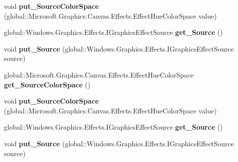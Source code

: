 \begin{DoxyCompactItemize}
void {\bfseries put\+\_\+\+Source\+Color\+Space} (global\+::\+Microsoft.\+Graphics.\+Canvas.\+Effects.\+Effect\+Hue\+Color\+Space value)
\item 
\mbox{\label{interface_microsoft_1_1_graphics_1_1_canvas_1_1_effects_1_1_i_hue_to_rgb_effect_a0d8641879596727e5f250feac4374dd2}} 
global\+::\+Windows.\+Graphics.\+Effects.\+I\+Graphics\+Effect\+Source {\bfseries get\+\_\+\+Source} ()
\item 
\mbox{\label{interface_microsoft_1_1_graphics_1_1_canvas_1_1_effects_1_1_i_hue_to_rgb_effect_a10be0ca9703e99422fcc7c71468e80e3}} 
void {\bfseries put\+\_\+\+Source} (global\+::\+Windows.\+Graphics.\+Effects.\+I\+Graphics\+Effect\+Source source)
\item 
\mbox{\label{interface_microsoft_1_1_graphics_1_1_canvas_1_1_effects_1_1_i_hue_to_rgb_effect_a8962ee09b8e43d2cfb870b6a526a9c3e}} 
global\+::\+Microsoft.\+Graphics.\+Canvas.\+Effects.\+Effect\+Hue\+Color\+Space {\bfseries get\+\_\+\+Source\+Color\+Space} ()
\item 
\mbox{\label{interface_microsoft_1_1_graphics_1_1_canvas_1_1_effects_1_1_i_hue_to_rgb_effect_a2764dc581ffb4eb37255a16155b58807}} 
void {\bfseries put\+\_\+\+Source\+Color\+Space} (global\+::\+Microsoft.\+Graphics.\+Canvas.\+Effects.\+Effect\+Hue\+Color\+Space value)
\item 
\mbox{\label{interface_microsoft_1_1_graphics_1_1_canvas_1_1_effects_1_1_i_hue_to_rgb_effect_a0d8641879596727e5f250feac4374dd2}} 
global\+::\+Windows.\+Graphics.\+Effects.\+I\+Graphics\+Effect\+Source {\bfseries get\+\_\+\+Source} ()
\item 
\mbox{\label{interface_microsoft_1_1_graphics_1_1_canvas_1_1_effects_1_1_i_hue_to_rgb_effect_a10be0ca9703e99422fcc7c71468e80e3}} 
void {\bfseries put\+\_\+\+Source} (global\+::\+Windows.\+Graphics.\+Effects.\+I\+Graphics\+Effect\+Source source)

\end{DoxyCompactItemize}
